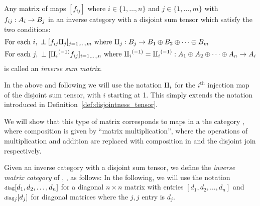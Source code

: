 \begin{definition}\label{def:inverse_sum_matrix}
  Any matrix of maps $[f_{i j}]$ where $i \in \{1,\ldots, n\}$ and $j \in \{1,\ldots, m\}$ with
  $f_{ij}:A_i \to B_j$ in an
  inverse  category \X with a disjoint sum  tensor which satisfy the two conditions:
  \begin{align}
    &\text{For each }i,\ \perp[f_{i j} \amalg_{j}]_{j=1,\ldots,m}
    \text{ where } \amalg_{j}: B_j \to B_1\oplus B_2\oplus\cdots\oplus B_m
      \label{eq:inverse_sum_matrix_row_perp}\\
    &\text{For each }j,\ \perp[{\amalg_{i}}^{(-1)} f_{i j}]_{i=1,\ldots,n}
    \text{ where } {\amalg_{i}}^{(-1)} = {\amalg_{i}}^{(-1)} : A_1\oplus A_2\oplus\cdots\oplus A_n \to A_i
    \label{eq:inverse_sum_matrix_column_perp}
  \end{align}
  is called an \emph{inverse sum matrix}.
\end{definition}

  In the above and following we will use the notation $\amalg_{i}$ for the $i^{\text{th}}$ injection
  map of the disjoint sum tensor, with $i$ starting at 1. This simply extends the notation
  introduced in Definition~\ref{def:disjointness_tensor}.

  We will show that this type of matrix corresponds to maps in a the category \imatx, where
  composition is given by ``matrix multiplication'', where the operations of multiplication and
  addition are replaced with composition in \X and the disjoint join respectively.

\begin{definition}\label{def:inverse_matrix_category}
  Given an inverse category \X with a disjoint sum tensor, we define the \emph{inverse
  matrix category} of \X, \imatx, as follows:
  In the following, we will use the notation $\operatorname{\scriptstyle{diag}}[d_1,d_2,\ldots,d_n]$ for a diagonal $n\times n$
  matrix with entries $[d_1,d_2,\ldots,d_n]$ and $\operatorname{\scriptstyle{diag}}_j[d_j]$ for diagonal matrices where the
  $j,j$ entry is $d_j$.
\end{definition}

